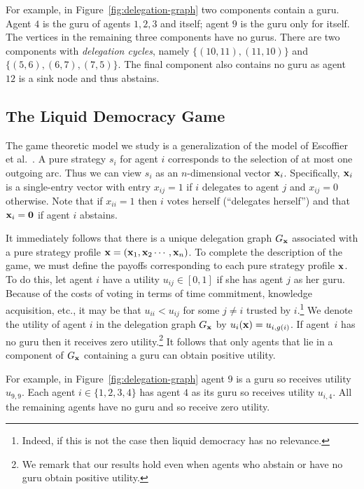 For example, in Figure~\ref{fig:delegation-graph} two components contain a guru. 
Agent $4$ is the guru of agents $1,2,3$ and itself; agent $9$ is the guru only for itself. 
The vertices in the remaining three components have no gurus.
There are two components with {\em delegation cycles}, namely $\{(10,11), (11, 10)\}$ and 
$\{(5,6), (6, 7), (7,5)\}$. The final component also contains no guru as agent $12$ is a sink node and thus abstains.






\subsection{The Liquid Democracy Game}\label{sec:delegation-game}
The game theoretic model we study is a generalization of the model of Escoffier et al.~\cite{EGP19}.
A pure strategy $s_i$ for agent $i$ corresponds to the selection of at most one outgoing arc.
Thus we can view $s_i$ as an $n$-dimensional vector ${\bf x}_i$. Specifically, 
${\bf x}_i$ is a single-entry vector with entry $x_{ij}=1$ if $i$ delegates to agent $j$ and $x_{ij}=0$ otherwise.
Note that if $x_{ii}=1$ then $i$ votes herself (``delegates herself'') and that ${\bf x}_i={\bf 0}$ if agent $i$ abstains.


It immediately follows that there is a unique delegation graph $G_{{\bf x}}$ associated with
a pure strategy profile ${\bf x}=({\bf x}_1, {\bf x}_2 \cdots, {\bf x}_n)$.
To complete the description of the game, we must define the payoffs corresponding to
each pure strategy profile ${\bf x}$. To do this, let agent $i$ have a utility $u_{ij}\in [0,1]$ if she 
has agent $j$ as her guru. Because of the costs of voting in terms of time commitment, knowledge acquisition, etc.,
it may be that $u_{ii}< u_{ij}$ for some $j\neq i$ trusted by $i$.\footnote{Indeed, if this is not the case then
liquid democracy has no relevance.}
We denote the utility of agent $i$ in the delegation graph $G_{{\bf x}}$ by $u_i({\bf x})=u_{i,g(i)}$. 
If agent~$i$ has no guru then it receives zero utility.\footnote{We remark that our results hold even when agents who abstain or have no guru obtain positive utility.}
It follows that only agents that lie in a component of $G_{{\bf x}}$ containing a guru can obtain positive utility.

For example, in Figure~\ref{fig:delegation-graph} agent $9$ is a guru so receives utility $u_{9,9}$.
Each agent $i\in \{1,2,3,4\}$ has agent $4$ as its guru so receives utility $u_{i,4}$. 
All the remaining agents have no guru and so receive zero utility.   

